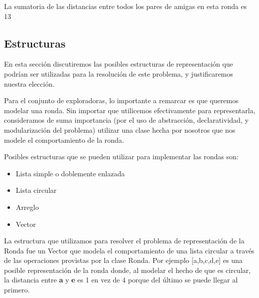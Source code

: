 \documentclass[11pt]{article}
\begin{document}
\begin{figure}[H]
\begin{center}
\end{center}
\end{figure}

La sumatoria de las distancias entre todos los pares de amigas en esta ronda es 13

\subsection{Estructuras}

En esta sección discutiremos las posibles estructuras de representación que podrían ser utilizadas
para la resolución de este problema, y justificaremos nuestra elección.

Para el conjunto de exploradoras, lo importante a remarcar es que queremos modelar una ronda. Sin importar
que utilicemos efectivamente para representarla, consideramos de suma importancia (por el uso de abstracción,
declaratividad, y modularización del problema) utilizar una clase hecha por nosotros que nos modele el 
comportamiento de la ronda.

Posibles estructuras que se pueden utilizar para implementar las rondas son: 
\begin{itemize}
\item Lista simple o doblemente enlazada
\item Lista circular
\item Arreglo
\item Vector
\end{itemize}
La estructura que utilizamos para resolver el problema de representación de la Ronda 
fue un Vector que modela el comportamiento de una 
lista circular a través de las operaciones provistas por la clase Ronda. Por ejemplo [a,b,c,d,e] es una 
posible representación de la ronda donde, al modelar el hecho de que es circular,
la distancia entre \textbf{a} y \textbf{e} es 1 en vez de 4 porque del último se puede llegar al primero.
\end{document}
